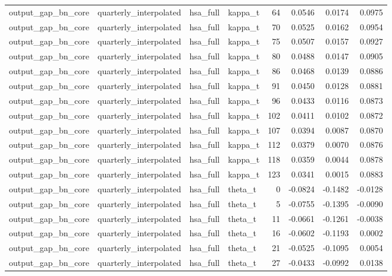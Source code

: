 \begin{tabular}{llllrrrr}
output\_gap\_bn\_core & quarterly\_interpolated & hsa\_full & kappa\_t & 64 & 0.0546 & 0.0174 & 0.0975 \\
output\_gap\_bn\_core & quarterly\_interpolated & hsa\_full & kappa\_t & 70 & 0.0525 & 0.0162 & 0.0954 \\
output\_gap\_bn\_core & quarterly\_interpolated & hsa\_full & kappa\_t & 75 & 0.0507 & 0.0157 & 0.0927 \\
output\_gap\_bn\_core & quarterly\_interpolated & hsa\_full & kappa\_t & 80 & 0.0488 & 0.0147 & 0.0905 \\
output\_gap\_bn\_core & quarterly\_interpolated & hsa\_full & kappa\_t & 86 & 0.0468 & 0.0139 & 0.0886 \\
output\_gap\_bn\_core & quarterly\_interpolated & hsa\_full & kappa\_t & 91 & 0.0450 & 0.0128 & 0.0881 \\
output\_gap\_bn\_core & quarterly\_interpolated & hsa\_full & kappa\_t & 96 & 0.0433 & 0.0116 & 0.0873 \\
output\_gap\_bn\_core & quarterly\_interpolated & hsa\_full & kappa\_t & 102 & 0.0411 & 0.0102 & 0.0872 \\
output\_gap\_bn\_core & quarterly\_interpolated & hsa\_full & kappa\_t & 107 & 0.0394 & 0.0087 & 0.0870 \\
output\_gap\_bn\_core & quarterly\_interpolated & hsa\_full & kappa\_t & 112 & 0.0379 & 0.0070 & 0.0876 \\
output\_gap\_bn\_core & quarterly\_interpolated & hsa\_full & kappa\_t & 118 & 0.0359 & 0.0044 & 0.0878 \\
output\_gap\_bn\_core & quarterly\_interpolated & hsa\_full & kappa\_t & 123 & 0.0341 & 0.0015 & 0.0883 \\
output\_gap\_bn\_core & quarterly\_interpolated & hsa\_full & theta\_t & 0 & -0.0824 & -0.1482 & -0.0128 \\
output\_gap\_bn\_core & quarterly\_interpolated & hsa\_full & theta\_t & 5 & -0.0755 & -0.1395 & -0.0090 \\
output\_gap\_bn\_core & quarterly\_interpolated & hsa\_full & theta\_t & 11 & -0.0661 & -0.1261 & -0.0038 \\
output\_gap\_bn\_core & quarterly\_interpolated & hsa\_full & theta\_t & 16 & -0.0602 & -0.1193 & 0.0002 \\
output\_gap\_bn\_core & quarterly\_interpolated & hsa\_full & theta\_t & 21 & -0.0525 & -0.1095 & 0.0054 \\
output\_gap\_bn\_core & quarterly\_interpolated & hsa\_full & theta\_t & 27 & -0.0433 & -0.0992 & 0.0138 \\

\end{tabular}
